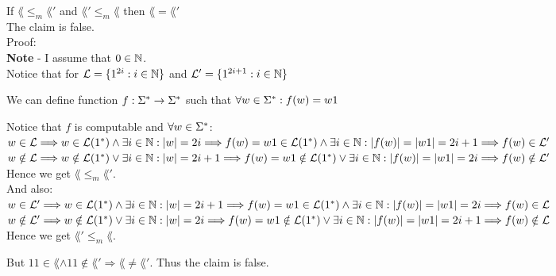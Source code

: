 If $\lang \leq_m \lang'$ and $\lang' \leq_m \lang$ then $\lang = \lang'$ \\
The claim is false. \\

Proof: \\
\textbf{Note} - I assume that $0 \in \mathbb{N}$. \\
Notice that for $\mathcal{L} = \{1^{2i} : i \in \mathbb{N}\}$ and
$\mathcal{L}' = \{1^{2i+1} : i \in \mathbb{N}\}$

We can define function $f: \Sigma^* \rightarrow \Sigma^*$ such that $\forall w \in \Sigma^*: f(w) = w1$

Notice that $f$ is computable and $\forall w \in \Sigma^*$: \\
$w \in \mathcal{L} \\
    \Longrightarrow w \in \mathcal{L}(1^*) \wedge \exists i \in \mathbb{N}: |w| = 2i \\
    \Longrightarrow f(w) = w1 \in \mathcal{L}(1^*) \wedge \exists i \in \mathbb{N}: |f(w)| = |w1| = 2i+1  \\
    \Longrightarrow f(w) \in \mathcal{L}'$ \\

$w \notin \mathcal{L} \\
    \Longrightarrow w \notin \mathcal{L}(1^*) \vee \exists i \in \mathbb{N}: |w| = 2i+1 \\
    \Longrightarrow f(w) = w1 \notin \mathcal{L}(1^*) \vee \exists i \in \mathbb{N}: |f(w)| = |w1| = 2i \\
    \Longrightarrow f(w) \notin \mathcal{L}'$ \\

Hence we get \underline{$\lang \leq_m \lang'$}. \\

And also: \\
$w \in \mathcal{L}' \\
    \Longrightarrow w \in \mathcal{L}(1^*) \wedge \exists i \in \mathbb{N}: |w| = 2i+1 \\
    \Longrightarrow f(w) = w1 \in \mathcal{L}(1^*) \wedge \exists i \in \mathbb{N}: |f(w)| = |w1| = 2i \\
    \Longrightarrow f(w) \in \mathcal{L}$ \\

$w \notin \mathcal{L}' \\
    \Longrightarrow w \notin \mathcal{L}(1^*) \vee \exists i \in \mathbb{N}: |w| = 2i \\
    \Longrightarrow f(w) = w1 \notin \mathcal{L}(1^*) \vee \exists i \in \mathbb{N}: |f(w)| = |w1| = 2i+1 \\
    \Longrightarrow f(w) \notin \mathcal{L}$ \\

Hence we get \underline{$\lang' \leq_m \lang$}.

But $11 \in \lang \wedge 11 \notin \lang' \Rightarrow \lang \neq \lang'$. Thus the claim is false. \\
